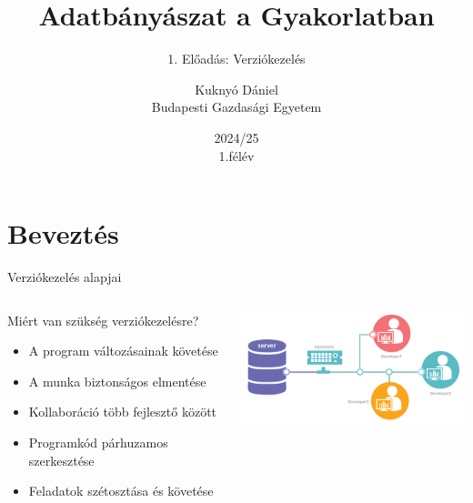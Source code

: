 \documentclass[english, aspectratio=169]{beamer}
\makeatletter
\newcommand\makebeamertitle{\frame{\maketitle}}
\let\origtableofcontents=\tableofcontents
\def\tableofcontents{\@ifnextchar[{\origtableofcontents}{\gobbletableofcontents}}
\def\gobbletableofcontents#1{\origtableofcontents}
\makeatother
\begin{document}
	\section{Beveztés}
	\title[]{Adatbányászat a Gyakorlatban}
	\subtitle{1. Előadás: Verziókezelés}
	\author[Kuknyó Dániel]{Kuknyó Dániel\\Budapesti Gazdasági Egyetem}
	\date{2024/25\\1.félév}
	\makebeamertitle
	
	\begin{frame}
		\tableofcontents{}
	\end{frame}
	
	\begin{frame}
		\tableofcontents[currentsection]
	\end{frame}
	
	\begin{frame}{Verziókezelés alapjai}
		\begin{columns}
			\begin{column}{0.5\textwidth}
				Miért van szükség verziókezelésre?
				\begin{itemize}
					\item A program változásainak követése
					\item A munka biztonságos elmentése
					\item Kollaboráció több fejlesztő között
					\item Programkód párhuzamos szerkesztése
					\item Feladatok szétosztása és követése
				\end{itemize}
			\end{column}
			\begin{column}{0.5\textwidth}
				\begin{center}
					\includegraphics[width=7cm, keepaspectratio]{images/version_control.png}
				\end{center}
			\end{column}
		\end{columns}
	\end{frame}
	
\end{document}

